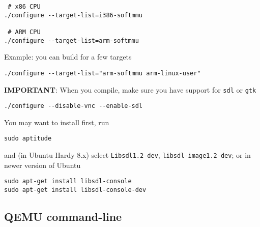 \begin{verbatim}
 # x86 CPU
./configure --target-list=i386-softmmu

 # ARM CPU
./configure --target-list=arm-softmmu
\end{verbatim}

Example: you can build for a few targets
\begin{verbatim}
./configure --target-list="arm-softmmu arm-linux-user"
\end{verbatim}
  
{\bf IMPORTANT}: When you compile, make sure you have support for \verb!sdl!
   or \verb!gtk!
\begin{verbatim}
./configure --disable-vnc --enable-sdl
\end{verbatim}
You may want to install first, run
\begin{verbatim}
sudo aptitude
\end{verbatim}
and (in Ubuntu Hardy 8.x) select \verb!Libsdl1.2-dev!,
\verb!libsdl-image1.2-dev!; or in newer version of Ubuntu
\begin{verbatim}
sudo apt-get install libsdl-console
sudo apt-get install libsdl-console-dev
\end{verbatim}


  

\subsection{QEMU command-line}
\label{sec:QEMU-command-line-options}


